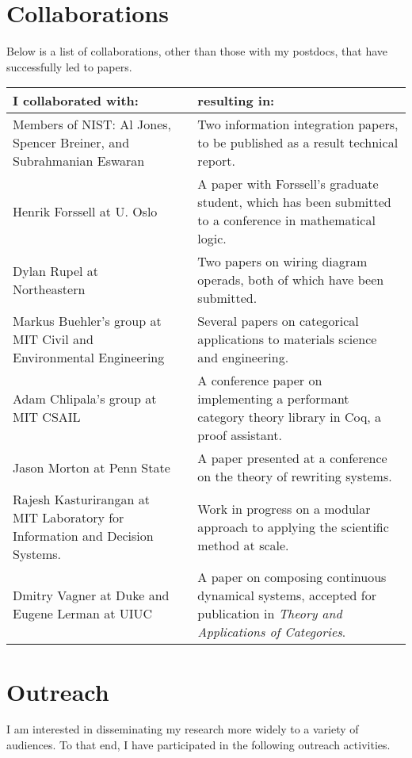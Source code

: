 \documentclass[11pt,oneside,article]{memoir}
\begin{document}
\section{Collaborations}\label{sec:collaborations}

Below is a list of collaborations, other than those with my postdocs, that have successfully led to papers. \\

\noindent\begin{tabular}{p{1.9in}lp{3.4in}}
\textbf{I collaborated with:}&&\textbf{resulting in:}\\\hline
Members of NIST: Al Jones, Spencer Breiner, and Subrahmanian Eswaran
&&
Two information integration papers, to be published as a result technical report.
\\
Henrik Forssell at U. Oslo
&&
A paper with Forssell's graduate student, which has been submitted to a conference in mathematical logic.\\
Dylan Rupel at Northeastern
&&
Two papers on wiring diagram operads, both of which have been submitted.
\\
Markus Buehler's group at MIT Civil and Environmental Engineering
&&
Several papers on categorical applications to materials science and engineering.
\\
Adam Chlipala's group at MIT CSAIL
&&
A conference paper on implementing a performant category theory library in Coq, a proof assistant.
\\
Jason Morton at Penn State
&&
A paper presented at a conference on the theory of rewriting systems.
\\
Rajesh Kasturirangan at MIT Laboratory for Information and Decision Systems.
&&
Work in progress on a modular approach to applying the scientific method at scale.
\\
Dmitry Vagner at Duke and Eugene Lerman at UIUC
&&
A paper on composing continuous dynamical systems, accepted for publication in \emph{Theory and Applications of Categories}.
\\

\end{tabular}

\section{Outreach}\label{sec:outreach}

I am interested in disseminating my research more widely to a variety of audiences. To that end, I have participated in the following outreach activities. \\
\end{document}
